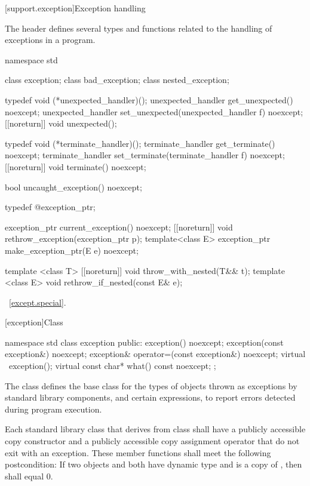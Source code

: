 [support.exception]{Exception handling}

\pnum
The header
defines several types and functions related to the handling of exceptions in a \Cpp program.


%
%
\begin{codeblock}
namespace std {
  class exception;
  class bad_exception;
  class nested_exception;

  typedef void (*unexpected_handler)();
  unexpected_handler get_unexpected() noexcept;
  unexpected_handler set_unexpected(unexpected_handler f) noexcept;
  [[noreturn]] void unexpected();

  typedef void (*terminate_handler)();
  terminate_handler get_terminate() noexcept;
  terminate_handler set_terminate(terminate_handler f) noexcept;
  [[noreturn]] void terminate() noexcept;

  bool uncaught_exception() noexcept;

  typedef @\unspec@ exception_ptr;

  exception_ptr current_exception() noexcept;
  [[noreturn]] void rethrow_exception(exception_ptr p);
  template<class E> exception_ptr make_exception_ptr(E e) noexcept;

  template <class T> [[noreturn]] void throw_with_nested(T&& t);
  template <class E> void rethrow_if_nested(const E& e);
}
\end{codeblock}

\xref~\ref{except.special}.

[exception]{Class }

%
\begin{codeblock}
namespace std {
  class exception {
  public:
    exception() noexcept;
    exception(const exception&) noexcept;
    exception& operator=(const exception&) noexcept;
    virtual ~exception();
    virtual const char* what() const noexcept;
  };
}
\end{codeblock}

\pnum
The class
defines the base
class for the types of objects thrown as exceptions by
\Cpp standard library components, and certain
expressions, to report errors detected during program execution.

\pnum
Each standard library class  that derives from class  shall have a
publicly accessible copy constructor and a publicly accessible copy assignment
operator that do not exit with an exception. These member functions shall meet
the following postcondition: If two objects  and  both have
dynamic type  and  is a copy of , then
 shall equal 0.

